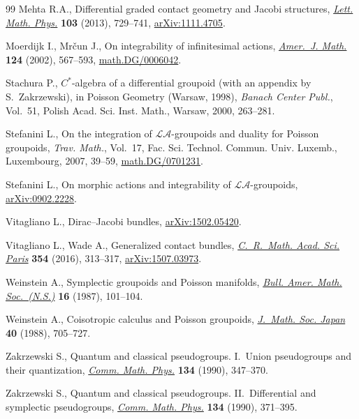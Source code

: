 \documentclass[10pt,a4paper]{amsart}
\numberwithin{equation}{section}
\begin{document}
\begin{thebibliography}{99}
Mehta R.A., Dif\/ferential graded contact geometry and {J}acobi structures,
 \href{https://doi.org/10.1007/s11005-013-0609-6}{\textit{Lett. Math. Phys.}} \textbf{103} (2013), 729--741, \href{https://arxiv.org/abs/1111.4705}{arXiv:1111.4705}.

Moerdijk I., Mr\v{c}un J., On integrability of inf\/initesimal actions,
 \href{https://doi.org/10.1353/ajm.2002.0019}{\textit{Amer.~J. Math.}} \textbf{124} (2002), 567--593,
 \href{https://arxiv.org/abs/math.DG/0006042}{math.DG/0006042}.

Stachura P., {$C^*$}-algebra of a dif\/ferential groupoid (with an appendix by
 {S}.~{Z}akrzewski), in Poisson Geometry ({W}arsaw, 1998), \textit{Banach
 Center Publ.}, Vol.~51, Polish Acad. Sci. Inst. Math., Warsaw, 2000,
 263--281.


Stefanini L., On the integration of {$\mathcal{LA}$}-groupoids and duality for
 {P}oisson groupoids, \textit{Trav. Math.}, Vol.~17, Fac. Sci. Technol. Commun. Univ. Luxemb., Luxembourg,
 2007, 39--59, \href{https://arxiv.org/abs/math.DG/0701231}{math.DG/0701231}.

Stefanini L., On morphic actions and integrability of $\mathcal{LA}$-groupoids,
 \href{https://arxiv.org/abs/0902.2228}{arXiv:0902.2228}.

Vitagliano L., Dirac--{J}acobi bundles, \href{https://arxiv.org/abs/1502.05420}{arXiv:1502.05420}.

Vitagliano L., Wade A., Generalized contact bundles, \href{https://doi.org/10.1016/j.crma.2015.12.009}{\textit{C.~R.~Math. Acad.
 Sci. Paris}} \textbf{354} (2016), 313--317, \href{https://arxiv.org/abs/1507.03973}{arXiv:1507.03973}.

Weinstein A., Symplectic groupoids and {P}oisson manifolds, \href{https://doi.org/10.1090/S0273-0979-1987-15473-5}{\textit{Bull. Amer.
 Math. Soc.~(N.S.)}} \textbf{16} (1987), 101--104.

Weinstein A., Coisotropic calculus and {P}oisson groupoids, \href{https://doi.org/10.2969/jmsj/04040705}{\textit{J.~Math.
 Soc. Japan}} \textbf{40} (1988), 705--727.

Zakrzewski S., Quantum and classical pseudogroups. {I}.~{U}nion pseudogroups
 and their quantization, \href{https://doi.org/10.1007/bf02097706}{\textit{Comm. Math. Phys.}} \textbf{134} (1990),
 347--370.

Zakrzewski S., Quantum and classical pseudogroups. {II}.~{D}if\/ferential and
 symplectic pseudogroups, \href{https://doi.org/10.1007/bf02097707}{\textit{Comm. Math. Phys.}} \textbf{134} (1990),
 371--395.

\end{thebibliography}
\end{document}
